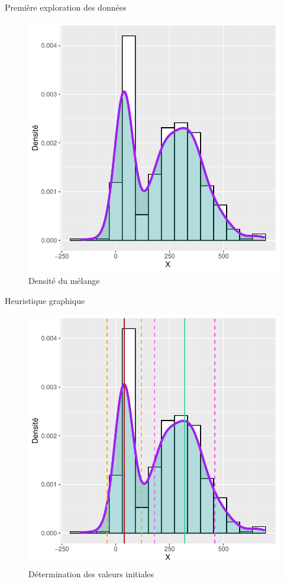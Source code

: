 \documentclass[11pt]{beamer}
\begin{document}
	\begin{frame}{Première exploration des données}
		\begin{figure}[H]
			\centering
			\includegraphics[scale=0.4]{dens1.pdf}
			\caption{Densité du mélange}
		\end{figure}
	\end{frame}

	\begin{frame}{Heuristique graphique}
		\begin{figure}[H]
			\centering
			\includegraphics[scale=0.4]{dens1bis.pdf}
			\caption{Détermination des valeurs initiales}
		\end{figure}
	\end{frame}
\end{document}

